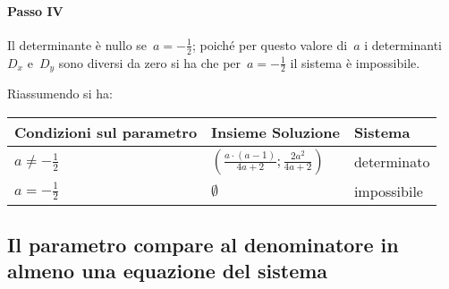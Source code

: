 \begin{exrig}
\begin{esempio}
\paragraph{Passo IV} Il determinante è nullo se~$a=-{\frac{1}{2}}$; poiché per questo valore di~$a$ i
determinanti~$D_{x}$ e~$D_{y}$ sono diversi da zero si ha che per~$a=-{\frac{1}{2}}$ il sistema
è impossibile.
\pagebreak

Riassumendo si ha:
\begin{center}
 \begin{tabular}{lll}
\toprule
Condizioni sul parametro & Insieme Soluzione & Sistema\\
\midrule
$a\neq -{\frac{1}{2}}$ & $\left(\frac{a\cdot (a-1)}{4a+2};\frac{2a^{2}}{4a+2}\right)$ & determinato\\
$a=-{\frac{1}{2}}$ & $\emptyset $ & impossibile\\
\bottomrule
\end{tabular}
\end{center}
 \end{esempio}
\end{exrig}

\subsection*{Il parametro compare al denominatore in almeno una equazione del sistema}

